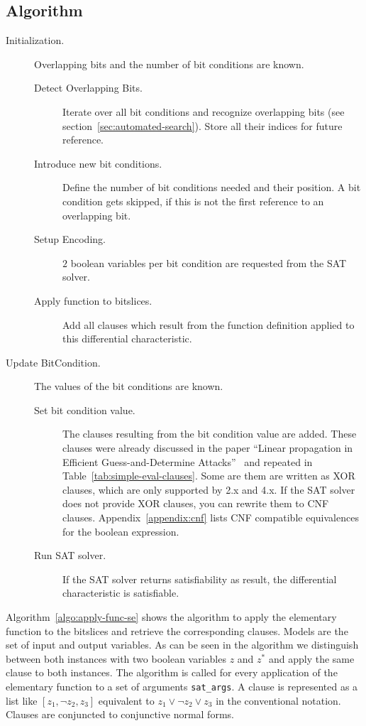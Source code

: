 \subsection{Algorithm}
\label{sec:simple-evaluation-algorithm}
%
\begin{description}
  \item[Initialization.] Overlapping bits and the number of bit conditions are known.
    \begin{description}
      \item[Detect Overlapping Bits.] Iterate over all bit conditions and recognize overlapping bits (see section~\ref{sec:automated-search}). Store all their indices for future reference.
      \item[Introduce new bit conditions.] Define the number of bit conditions needed and their position. A bit condition gets skipped, if this is not the first reference to an overlapping bit.
      \item[Setup Encoding.] $2$ boolean variables per bit condition are requested from the SAT solver.
      \item[Apply function to bitslices.] Add all clauses which result from the function definition applied to this differential characteristic.
    \end{description}
  \item[Update BitCondition.] The values of the bit conditions are known.
    \begin{description}
      \item[Set bit condition value.] The clauses resulting from the bit condition value are added. These clauses were already discussed in the paper ``Linear propagation in Efficient Guess-and-Determine Attacks''~\cite[6]{Cry16} and repeated in Table~\ref{tab:simple-eval-clauses}. Some are them are written as XOR clauses, which are only supported by \cmsat{} 2.x and 4.x. If the SAT solver does not provide XOR clauses, you can rewrite them to CNF clauses. Appendix~\ref{appendix:cnf} lists CNF compatible equivalences for the boolean expression.
      \item[Run SAT solver.] If the SAT solver returns satisfiability as result, the differential characteristic is satisfiable.
    \end{description}
\end{description}

Algorithm~\ref{algo:apply-func-se} shows the algorithm to apply the elementary function to the bitslices and retrieve the corresponding clauses. Models are the set of input and output variables. As can be seen in the algorithm we distinguish between both instances with two boolean variables $z$ and $z^*$ and apply the same clause to both instances. The algorithm is called for every application of the elementary function to a set of arguments \texttt{sat\_args}. A clause is represented as a list like $[z_1, \neg z_2, z_3]$ equivalent to $z_1 \lor \neg z_2 \lor z_3$ in the conventional notation. Clauses are conjuncted to conjunctive normal forms.

